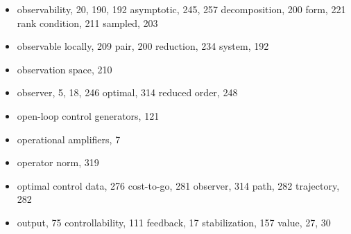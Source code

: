 \begin{itemize}
  \item observability, 20, 190, 192
    \subitem asymptotic, 245, 257
    \subitem decomposition, 200
    \subitem form, 221
    \subitem rank condition, 211
    \subitem sampled, 203
  \item observable
    \subitem locally, 209
    \subitem pair, 200
    \subitem reduction, 234
    \subitem system, 192
  \item observation space, 210
  \item observer, 5, 18, 246
    \subitem optimal, 314
    \subitem reduced order, 248
  \item open-loop control generators, 121
  \item operational amplifiers, 7
  \item operator norm, 319
  \item optimal
    \subitem control data, 276
    \subitem cost-to-go, 281
    \subitem observer, 314
    \subitem path, 282
    \subitem trajectory, 282
  \item output, 75
    \subitem controllability, 111
    \subitem feedback, 17
    \subitem stabilization, 157
    \subitem value, 27, 30

  \indexspace


\end{itemize}
